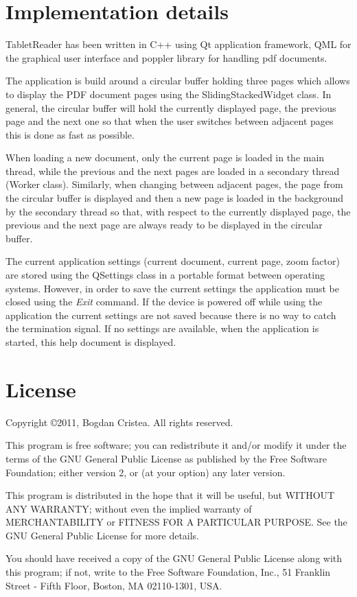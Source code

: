 \documentclass[journal,12pt]{IEEEtran}
\begin{document}
\section{Implementation details}
TabletReader has been written in C++ using Qt application framework, QML for the graphical user interface and poppler library for handling pdf documents. 

The application is build around a circular buffer holding three pages which allows to display the PDF document pages using the \textrm{SlidingStackedWidget} class. In general, the circular buffer will hold the currently displayed page, the previous page and the next one so that when the user switches between adjacent pages this is done as fast as possible. 

When loading a new document, only the current page is loaded in the main thread, while the previous and the next pages are loaded in a secondary thread (\textrm{Worker} class). Similarly, when changing between adjacent pages, the page from the circular buffer is displayed and then a new page is loaded in the background by the secondary thread so that, with respect to the currently displayed page, the previous and the next page are always ready to be displayed in the circular buffer.

The current application settings (current document, current page, zoom factor) are stored using the \textrm{QSettings} class in a portable format between operating systems. However, in order to save the current settings the application must be closed using the \textit{Exit} command. If the device is powered off while using the application the current settings are not saved because there is no way to catch the termination signal. If no settings are available, when the application is started, this help document is displayed.

\section{License}
 Copyright \copyright 2011, Bogdan Cristea. All rights reserved.
 
 This program is free software; you can redistribute it and/or modify  it under the terms of the GNU General Public License as published by  the Free Software Foundation; either version 2, or (at your option)  any later version.
 
 This program is distributed in the hope that it will be useful,  but WITHOUT ANY WARRANTY; without even the implied warranty of
 MERCHANTABILITY or FITNESS FOR A PARTICULAR PURPOSE.  See the  GNU General Public License for more details.
 
 You should have received a copy of the GNU General Public License along with this program; if not, write to the Free Software
 Foundation, Inc., 51 Franklin Street - Fifth Floor, Boston, MA 02110-1301, USA.
\end{document}
